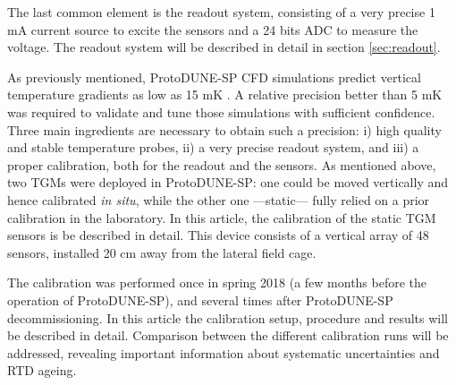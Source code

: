 The last common element is the readout system, consisting of a very precise 1 mA current source to excite the sensors and a 24 bits ADC to measure the voltage. The readout system will be described in detail in section \ref{sec:readout}. 

As previously mentioned, ProtoDUNE-SP CFD simulations predict vertical temperature gradients as low as 15 mK \cite{pdsp_tdr}. A relative precision better than 5 mK was required to validate and tune those simulations with sufficient confidence. Three main ingredients are necessary to obtain such a precision: i) high quality and stable temperature probes, ii) a very precise readout system, and iii) a proper calibration, both for the readout and the sensors. As mentioned above, two TGMs were deployed in ProtoDUNE-SP: one could be moved vertically and hence calibrated \textit{in situ}, while the other one ---static--- fully relied on a prior calibration in the laboratory. In this article, the calibration of the static TGM \cite{tfm} sensors is be described in detail. This device consists of a vertical array of 48 sensors, installed 20 cm away from the lateral field cage. 

The calibration was performed once in spring 2018  (a few months before the operation of ProtoDUNE-SP), and several times after ProtoDUNE-SP decommissioning. In this article the calibration setup, procedure and results will be described in detail. Comparison between the different calibration runs will be addressed, revealing important information about systematic uncertainties and RTD ageing.